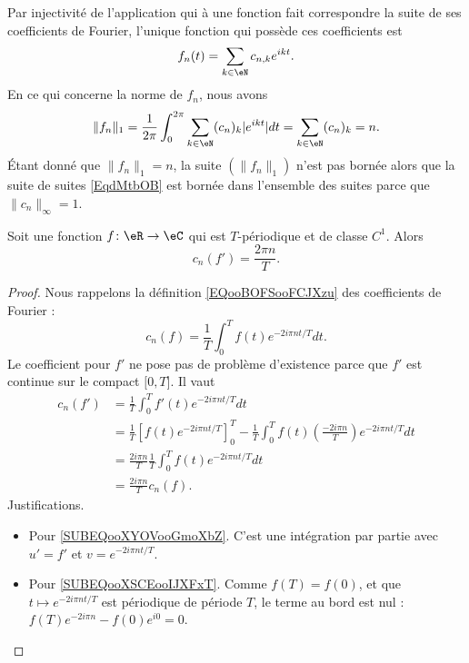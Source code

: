 Par injectivité de l'application qui à une fonction fait correspondre la suite de ses coefficients de Fourier, l'unique fonction qui possède ces coefficients est
\begin{equation}
	f_n(t)=\sum_{k\in \eN}c_{n,k} e^{ikt}.
\end{equation}
En ce qui concerne la norme de \( f_n\), nous avons
\begin{equation}
	\| f_n \|_1=\frac{1}{ 2\pi }\int_0^{2\pi}\sum_{k\in \eN}(c_n)_k|  e^{ikt} |dt=\sum_{k\in \eN}(c_n)_k=n.
\end{equation}
Étant donné que \( \| f_n \|_1=n\), la suite \( (\| f_n \|_1)\) n'est pas bornée alors que la suite de suites \eqref{EqdMtbOB} est bornée dans l'ensemble des suites parce que \( \| c_n \|_{\infty}=1\).

\begin{lemma}       \label{LEMooPUJDooKRBTaU}
	Soit une fonction \( f\colon \eR\to \eC\) qui est \( T\)-périodique et de classe \( C^1\). Alors
	\begin{equation}
		c_n(f')=\frac{ 2\pi n }{ T }.
	\end{equation}
\end{lemma}

\begin{proof}
	Nous rappelons la définition \eqref{EQooBOFSooFCJXzu} des coefficients de Fourier :
	\begin{equation}
		c_n(f)=\frac{1}{ T }\int_0^Tf(t) e^{-2 i \pi n t/T}dt.
	\end{equation}
	Le coefficient pour \( f'\) ne pose pas de problème d'existence parce que \( f'\) est continue sur le compact \( \mathopen[ 0 , T \mathclose]\). Il vaut
	\begin{subequations}
		\begin{align}
			c_n(f') & =\frac{1}{ T }\int_0^Tf'(t) e^{-2 i \pi n t/T}dt                                                                                                                   \\
			        & =\frac{1}{ T }\left[ f(t) e^{-2i\pi nt/T} \right]_0^T-\frac{1}{ T }\int_0^Tf(t)\left( \frac{ -2i\pi n }{ T } \right) e^{-2i\pi nt/T}dt \label{SUBEQooXYOVooGmoXbZ} \\
			        & =\frac{ 2i\pi n }{ T }\frac{1}{ T }\int_0^Tf(t) e^{-2i\pi nt/T}dt \label{SUBEQooXSCEooIJXFxT}                                                                      \\
			        & =\frac{ 2i\pi n }{ T }c_n(f).
		\end{align}
	\end{subequations}
	Justifications.
	\begin{itemize}
		\item Pour \eqref{SUBEQooXYOVooGmoXbZ}. C'est une intégration par partie avec \( u'=f'\) et \( v= e^{-2i\pi nt/T}\).
		\item Pour \eqref{SUBEQooXSCEooIJXFxT}. Comme \( f(T)=f(0)\), et que \( t\mapsto e^{-2i\pi nt/T}\) est périodique de période \( T\), le terme au bord est nul : \( f(T) e^{-2i\pi n}-f(0) e^{i0}=0\).
	\end{itemize}
\end{proof}

